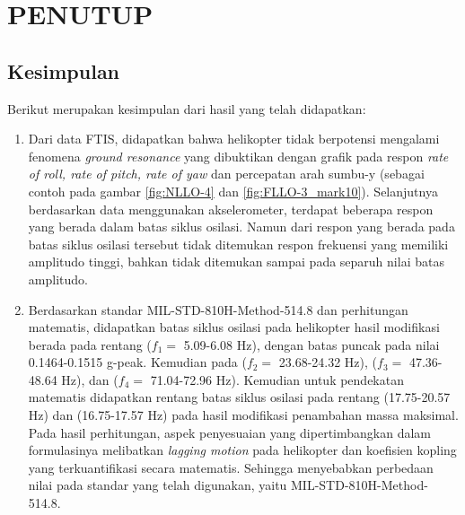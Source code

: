 \chapter{PENUTUP}
\label{chap:penutup}


\section{Kesimpulan}
\label{sec:kesimpulan}

Berikut merupakan kesimpulan dari hasil yang telah didapatkan:

\begin{enumerate}[nolistsep]

	\item Dari data FTIS, didapatkan bahwa helikopter tidak berpotensi mengalami fenomena \textit{ground resonance} yang dibuktikan dengan grafik pada respon \textit{rate of roll, rate of pitch, rate of yaw} dan percepatan arah sumbu-y (sebagai contoh pada gambar \ref{fig:NLLO-4} dan \ref{fig:FLLO-3_mark10}). Selanjutnya berdasarkan data menggunakan akselerometer, terdapat beberapa respon yang berada dalam batas siklus osilasi. Namun dari respon yang berada pada batas siklus osilasi tersebut tidak ditemukan respon frekuensi yang memiliki amplitudo tinggi, bahkan tidak ditemukan sampai pada separuh nilai batas amplitudo. 

	\item Berdasarkan standar MIL-STD-810H-Method-514.8 dan perhitungan matematis, didapatkan batas siklus osilasi pada helikopter hasil modifikasi berada pada rentang ($f_1=$ 5.09-6.08 Hz), dengan batas puncak pada nilai 0.1464-0.1515 g-peak. Kemudian pada ($f_2=$ 23.68-24.32 Hz), ($f_3=$ 47.36-48.64 Hz), dan ($f_4=$ 71.04-72.96 Hz). Kemudian untuk pendekatan matematis didapatkan rentang batas siklus osilasi pada rentang (17.75-20.57 Hz) dan (16.75-17.57 Hz) pada hasil modifikasi penambahan massa maksimal. Pada hasil perhitungan, aspek penyesuaian yang dipertimbangkan dalam formulasinya melibatkan \textit{lagging motion} pada helikopter dan koefisien kopling yang terkuantifikasi secara matematis. Sehingga menyebabkan perbedaan nilai pada standar yang telah digunakan, yaitu MIL-STD-810H-Method-514.8.
     

\end{enumerate}
